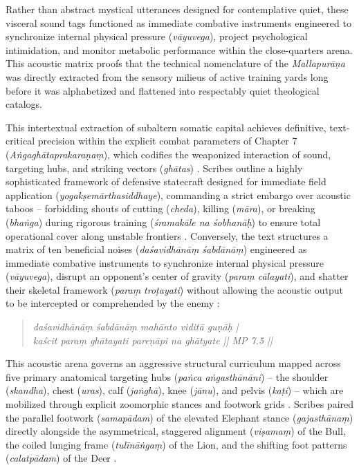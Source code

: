 \documentclass[11pt,twoside,letterpaper]{article}
\begin{document}
Rather than abstract mystical utterances designed for contemplative quiet, these visceral sound tags functioned as immediate combative instruments engineered to synchronize internal physical pressure (\textit{vāyuvega}), project psychological intimidation, and monitor metabolic performance within the close-quarters arena. This acoustic matrix proofs that the technical nomenclature of the \textit{Mallapurāṇa} was directly extracted from the sensory milieus of active training yards long before it was alphabetized and flattened into respectably quiet theological catalogs.

This intertextual extraction of subaltern somatic capital achieves definitive, text-critical precision within the explicit combat parameters of Chapter 7 (\textit{Aṅgaghātaprakaraṇaṃ}), which codifies the weaponized interaction of sound, targeting hubs, and striking vectors (\textit{ghātas}) \citep{MP_7}. Scribes outline a highly sophisticated framework of defensive statecraft designed for immediate field application (\textit{yogakṣemārthasiddhaye}), commanding a strict embargo over acoustic taboos -- forbidding shouts of cutting (\textit{cheda}), killing (\textit{māra}), or breaking (\textit{bhaṅga}) during rigorous training (\textit{śramakāle na śobhanāḥ}) to ensure total operational cover along unstable frontiers \citep{MP_7}. Conversely, the text structures a matrix of ten beneficial noises (\textit{daśavidhānāṃ śabdānāṃ}) engineered as immediate combative instruments to synchronize internal physical pressure (\textit{vāyuvega}), disrupt an opponent's center of gravity (\textit{paraṃ cālayati}), and shatter their skeletal framework (\textit{paraṃ troṭayati}) without allowing the acoustic output to be intercepted or comprehended by the enemy \citep{MP_7}:

\begin{quote}
\small
\textit{daśavidhānāṃ śabdānāṃ mahānto viditā guṇāḥ | \\
kaścit paraṃ ghātayati pareṇāpi na ghātyate || MP 7.5 ||}
\end{quote}

This acoustic arena governs an aggressive structural curriculum mapped across five primary anatomical targeting hubs (\textit{paṅca aṅgasthānāni}) -- the shoulder (\textit{skandha}), chest (\textit{uras}), calf (\textit{jaṅghā}), knee (\textit{jānu}), and pelvis (\textit{kaṭi}) -- which are mobilized through explicit zoomorphic stances and footwork grids \citep{MP_7}. Scribes paired the parallel footwork (\textit{samapādam}) of the elevated Elephant stance (\textit{gajasthānaṃ}) directly alongside the asymmetrical, staggered alignment (\textit{viṣamaṃ}) of the Bull, the coiled lunging frame (\textit{tulīnāṅgaṃ}) of the Lion, and the shifting foot patterns (\textit{calatpādam}) of the Deer \citep{MP_7}. 
\end{document}
